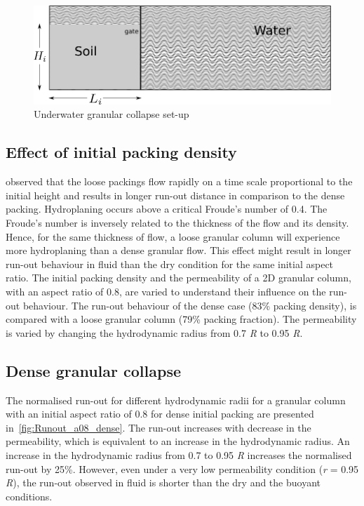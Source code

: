 \documentclass[12pt,a4paper,twocolumn,fleqn]{narms}
\begin{document}
\begin{figure}[htpb]
\includegraphics[width=0.97\columnwidth]{figs/geometry.png}
\caption{Underwater granular collapse set-up}
\label{fig:setup}
\end{figure}

\subsection{Effect of initial packing density}

 observed that the loose packings flow rapidly on a time
scale proportional to the initial height and results in longer run-out distance 
in comparison to the dense packing. Hydroplaning occurs above a critical 
Froude's number of 0.4. The Froude's number is inversely related to the 
thickness of the flow and its density. Hence, for the same thickness of flow, a 
loose granular column will experience more hydroplaning than a dense granular 
flow. This effect might result in longer run-out behaviour in fluid than the 
dry condition for the same initial aspect ratio. The initial packing density 
and the permeability of a 2D granular column, with an aspect ratio of 0.8, are 
varied to understand their influence on the run-out behaviour. The run-out 
behaviour of the dense case (83\% packing density), is compared with a loose
granular column (79\% packing fraction). The permeability is varied by changing
the hydrodynamic radius from 0.7 \textit{R} to 0.95 \textit{R}. 

\subsection{Dense granular collapse}
The normalised run-out for different hydrodynamic radii for a granular column 
with an initial aspect ratio of 0.8 for dense initial packing are presented 
in~\cref{fig:Runout_a08_dense}. The run-out increases with decrease in the 
permeability, which is equivalent to an increase in the hydrodynamic radius. 
An increase in the hydrodynamic radius from 0.7 to 0.95 \textit{R} increases 
the normalised run-out by 25\%. However, even under a very low permeability 
condition (\textit{r} = 0.95 \textit{R}), the run-out observed in fluid is 
shorter than the dry and the buoyant conditions. 
\end{document}
